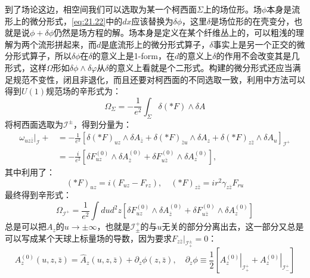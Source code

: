 到了场论这边，相空间我们可以选取为某一个柯西面$\Sigma$上的场位形。场$\phi$本身是流形上的微分形式，\ref{eq:21.22}中的$dx$应该替换为$\delta\phi$，这里$\delta$是场位形的在壳变分，也就是说$\phi+\delta \phi$仍然是场方程的解。场本身是定义在某个纤维丛上的，可以粗浅的理解为两个流形拼起来，而$d$是底流形上的微分形式算子，$\delta$事实上是另一个正交的微分形式算子，所以$\delta\phi$在$\delta$的意义上是1\mbox{-}form，在$d$的意义上$\delta$的作用不会改变其是几形式，这样$\Omega$形如$\delta\phi\wedge\delta\varphi$从$\delta$的意义上看就是个二形式。构建的微分形式还应当满足规范不变性，闭且非退化，而且还要对柯西面的不同选取一致，利用\cite{Wald:1999wa}中方法可以得到$U(1)$规范场的辛形式为：
\begin{equation}
	\Omega_{\Sigma}=-\frac{1}{e^{2}}\int_{\Sigma}\delta(*F)\wedge\delta A
\end{equation}
将柯西面选取为$\mathcal{I}^{\pm}$，得到分量为：
\begin{equation}
	\begin{aligned}
		\omega_{uz\bar{z}}|_{\mathcal{I}}+& =-\frac{1}{e^{2}}\left[\delta(*F)_{uz}\wedge\delta A_{\bar{z}}+\delta(*F)_{\bar{z}u}\wedge\delta A_{z}+\delta(*F)_{z\bar{z}}\wedge\delta A_{u}\right]_{\mathcal{I}^{+}}  \\
		&=-\frac{i}{e^{2}}\left[\delta F_{uz}^{(0)}\wedge\delta A_{\bar{z}}^{(0)}+\delta F_{u\bar{z}}^{(0)}\wedge\delta A_{z}^{(0)}\right],
	\end{aligned}
\end{equation}
其中利用了：
\begin{equation}
	(*F)_{uz}=i\left(F_{uz}-F_{rz}\right),\quad(*F)_{z\bar{z}}=ir^{2}\gamma_{z\bar{z}}F_{ru}
\end{equation}
最终得到辛形式：
\begin{equation}\label{eq:23.29}
	\Omega_{\mathcal{I}^+}=\frac{1}{e^2}\int dud^2z\left[\delta F_{uz}^{(0)}\wedge\delta A_{\bar{z}}^{(0)}+\delta F_{u\bar{z}}^{(0)}\wedge\delta A_{z}^{(0)}\right]
\end{equation}
总是可以把$A_z$的$u\to\pm {\infty}$，也就是$\mathcal{I}^+_{\pm}$的与$u$无关的部分分离出去，这一部分又总是可以写成某个天球上标量场的导数，因为要求$F_{z\bar z}|_{\mathcal{I}_{+}^{\pm}}=0$：
\begin{equation}
	A_z^{(0)}(u,z,\bar{z})=\hat{A}_z(u,z,\bar{z})+\partial_z\phi(z,\bar{z}),\quad\partial_z\phi\equiv\frac{1}{2}\left[\left.A_z^{(0)}\right|_{\mathcal I_+^+}+\left.A_z^{(0)}\right|_{\mathcal I_-^+}\right]
\end{equation}
